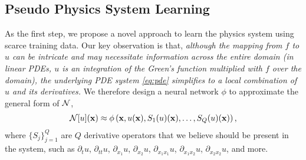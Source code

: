 
% 




\subsection{Pseudo Physics System Learning}\label{sect:phi}
As the first step, we propose a novel approach to learn the physics system using scarce training data. 
Our key observation is that, \textit{although the mapping from $f$ to $u$ can be intricate and may necessitate information across the entire domain (\eg in linear PDEs, $u$ is an integration of the Green's function multiplied with $f$ over the domain), the underlying PDE system \eqref{eq:pde} simplifies to a local combination of $u$ and its derivatives.} We therefore design a neural network $\phi$ to approximate the general form of $\mathcal{N}$, 
\begin{align}
    \mathcal{N}[u]({\bf x}) \approx \phi\left({\bf x}, u({\bf x}), S_1(u)({\bf x}), \ldots, S_Q(u)({\bf x})\right), \label{eq:pde-learn}
\end{align}
where  $\{S_j\}_{j=1}^Q$ are $Q$  derivative operators that we believe should be present in the system, such as $\partial_t u$, $\partial_{tt} u$, $\partial_{x_1} u$, $\partial_{x_2} u$,  
$\partial_{x_1x_1} u$, $\partial_{x_1x_2} u$, $\partial_{x_2x_2}u$, and more. 

